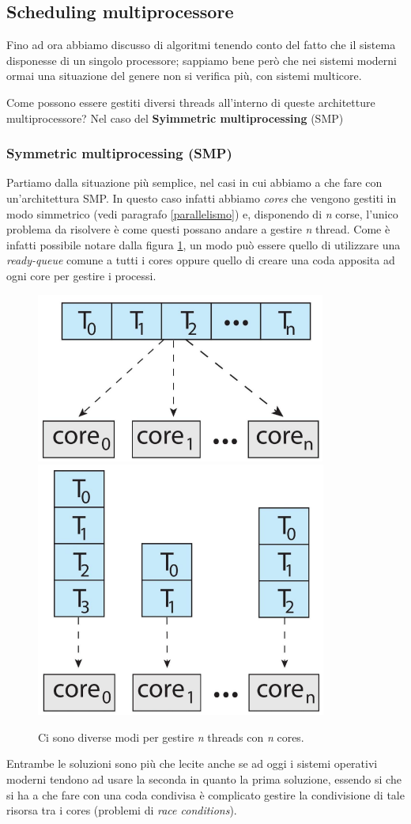 % 
\subsection{Scheduling multiprocessore}
Fino ad ora abbiamo discusso di algoritmi tenendo conto del fatto che il sistema disponesse di un singolo processore; sappiamo bene però che nei sistemi moderni ormai una situazione del genere non si verifica più, con sistemi multicore. 

Come possono essere gestiti diversi threads all'interno di queste architetture multiprocessore? Nel caso del \textbf{Syimmetric multiprocessing} (SMP) 

\subsubsection{Symmetric multiprocessing (SMP)}
Partiamo dalla situazione più semplice, nel casi in cui abbiamo a che fare con un'architettura SMP. In questo caso infatti abbiamo \textit{cores} che vengono gestiti in modo simmetrico (vedi paragrafo \ref{parallelismo}) e, disponendo di \textit{n} corse, l'unico problema da risolvere è come questi possano andare a gestire \textit{n} thread. Come è infatti possibile notare dalla figura \ref{fig:solutionAB}, un modo può essere quello di utilizzare una \textit{ready-queue} comune a tutti i cores oppure quello di creare una coda apposita ad ogni core per gestire i processi. 
\begin{figure}[h]
    \centering
    \includegraphics[width = .25\textwidth]{../res/imgs/CPU scheduling/solution_A.png}
    \hspace{2em}
    \includegraphics[width = .25\textwidth]{../res/imgs/CPU scheduling/solution_B.png}
    \caption{Ci sono diverse modi per gestire \textit{n} threads con \textit{n} cores.}
    \label{fig:solutionAB}
\end{figure}
Entrambe le soluzioni sono più che lecite anche se ad oggi i sistemi operativi moderni tendono ad usare la seconda in quanto la prima soluzione, essendo si che si ha a che fare con una coda condivisa è complicato gestire la condivisione di tale risorsa tra i cores (problemi di \textit{race conditions}).

